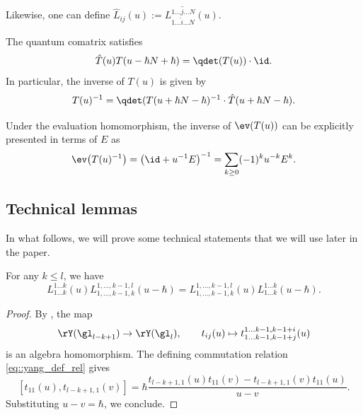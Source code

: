 	Likewise, one can define $\hat{L}_{ij}(u) := L_{1\dots \hat{i} \dots N}^{1\dots \hat{j} \dots N}(u)$.
	
	\begin{Proposition}
		\label{prop::inverse_comatrix}
		The quantum comatrix satisfies
		\[
		\hat{T}(u) T(u - \hbar N+ \hbar) = \qdet(T(u))\cdot \id.
		\]
		In particular, the inverse of $T(u)$ is given by
		\[
		T(u)^{-1} = \qdet(T(u+\hbar N - \hbar)^{-1}\cdot \hat{T}(u+\hbar N - \hbar).
		\]
	\end{Proposition}
	
	Under the evaluation homomorphism, the inverse of $\ev(T(u))$ can be explicitly presented in terms of $E$ as
	\begin{equation}
		\label{eq::inverse_series}
		\ev\bigl(T(u)^{-1}\bigr) = \bigl(\id + u^{-1} E\bigr)^{-1} = \sum\limits_{k\geq 0} (-1)^k u^{-k} E^k.
	\end{equation}
	
	\subsection{Technical lemmas} In what follows, we will prove some technical statements that we will use later in the paper.
	
	\begin{Proposition}
		\label{prop::minor_ac_comm}
		For any $k\leq l$, we have
		\begin{equation*}
			L_{1\dots k}^{1\dots k}(u) L_{1,\dots,k-1,k}^{1,\dots,k-1,l}(u-\hbar) = L_{1,\dots,k-1,k}^{1,\dots,k-1,l}(u) L_{1\dots k}^{1\dots k}(u-\hbar).
		\end{equation*}
		\begin{proof}
			By \cite[Theorem 1.12.1]{MolevYangians}, the map
			\begin{equation*}
				\rY(\gl_{l-k+1}) \rightarrow \rY(\gl_{l}), \qquad t_{ij}(u) \mapsto t_{1\dots k-1,k-1+j}^{1\dots k-1,k-1+i}(u)
			\end{equation*}
			is an algebra homomorphism. The defining commutation relation \eqref{eq::yang_def_rel} gives
			\[
			[t_{11}(u),t_{l-k+1,1}(v)] = \hbar \frac{t_{l-k+1,1}(u) t_{11}(v) - t_{l-k+1,1}(v) t_{11}(u)}{u-v}.
			\]
			Substituting $u-v=\hbar$, we conclude.
		\end{proof}
	\end{Proposition}
	
